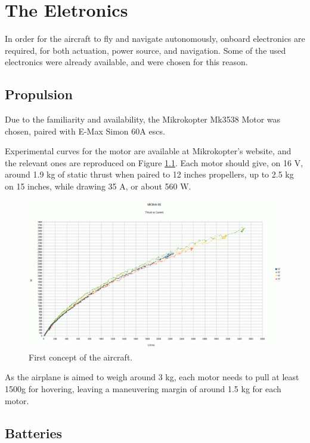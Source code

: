 
\chapter{The Eletronics} \label{chap:electronics}

In order for the aircraft to fly and navigate autonomously, onboard electronics are required, for both actuation, power source, and navigation. Some of the used electronics were already available, and were chosen for this reason.
	
\section{Propulsion}

Due to the familiarity and availability, the Mikrokopter Mk3538 Motor was chosen, paired with E-Max Simon 60A escs.

Experimental curves for the motor are available at Mikrokopter's website, and the relevant ones are reproduced on Figure \ref{fig:motorcurves}. Each motor should give, on 16 V, around 1.9 kg of static thrust when paired to 12 inches propellers, up to 2.5 kg on 15 inches, while drawing 35 A, or about 560 W.
\begin{figure}[h]
\centering
  \includegraphics[width=\linewidth]{figs/motorcurves.png}
  \caption{First concept of the aircraft.}
  \label{fig:motorcurves}
\end{figure}

As the airplane is aimed to weigh around 3 kg, each motor needs to pull at least 1500g for hovering, leaving a maneuvering margin of around 1.5 kg for each motor.

\section{Batteries}

